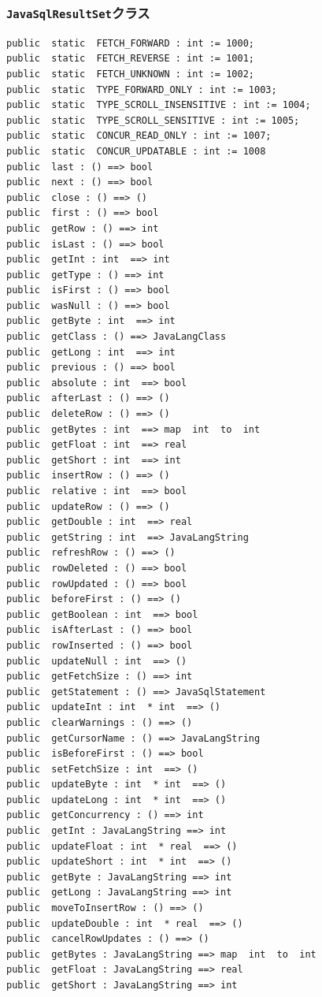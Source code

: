 \documentclass[\pformat,12pt]{jarticle}
\begin{document}
\subsubsection{\texttt{JavaSqlResultSet}クラス}
\begin{small}
\begin{verbatim}
public  static  FETCH_FORWARD : int := 1000;
public  static  FETCH_REVERSE : int := 1001;
public  static  FETCH_UNKNOWN : int := 1002;
public  static  TYPE_FORWARD_ONLY : int := 1003;
public  static  TYPE_SCROLL_INSENSITIVE : int := 1004;
public  static  TYPE_SCROLL_SENSITIVE : int := 1005;
public  static  CONCUR_READ_ONLY : int := 1007;
public  static  CONCUR_UPDATABLE : int := 1008
public  last : () ==> bool
public  next : () ==> bool
public  close : () ==> ()
public  first : () ==> bool
public  getRow : () ==> int
public  isLast : () ==> bool
public  getInt : int  ==> int
public  getType : () ==> int
public  isFirst : () ==> bool
public  wasNull : () ==> bool
public  getByte : int  ==> int
public  getClass : () ==> JavaLangClass
public  getLong : int  ==> int
public  previous : () ==> bool
public  absolute : int  ==> bool
public  afterLast : () ==> ()
public  deleteRow : () ==> ()
public  getBytes : int  ==> map  int  to  int
public  getFloat : int  ==> real
public  getShort : int  ==> int
public  insertRow : () ==> ()
public  relative : int  ==> bool
public  updateRow : () ==> ()
public  getDouble : int  ==> real
public  getString : int  ==> JavaLangString
public  refreshRow : () ==> ()
public  rowDeleted : () ==> bool
public  rowUpdated : () ==> bool
public  beforeFirst : () ==> ()
public  getBoolean : int  ==> bool
public  isAfterLast : () ==> bool
public  rowInserted : () ==> bool
public  updateNull : int  ==> ()
public  getFetchSize : () ==> int
public  getStatement : () ==> JavaSqlStatement
public  updateInt : int  * int  ==> ()
public  clearWarnings : () ==> ()
public  getCursorName : () ==> JavaLangString
public  isBeforeFirst : () ==> bool
public  setFetchSize : int  ==> ()
public  updateByte : int  * int  ==> ()
public  updateLong : int  * int  ==> ()
public  getConcurrency : () ==> int
public  getInt : JavaLangString ==> int
public  updateFloat : int  * real  ==> ()
public  updateShort : int  * int  ==> ()
public  getByte : JavaLangString ==> int
public  getLong : JavaLangString ==> int
public  moveToInsertRow : () ==> ()
public  updateDouble : int  * real  ==> ()
public  cancelRowUpdates : () ==> ()
public  getBytes : JavaLangString ==> map  int  to  int
public  getFloat : JavaLangString ==> real
public  getShort : JavaLangString ==> int

\end{verbatim}
\end{small}
\end{document}
